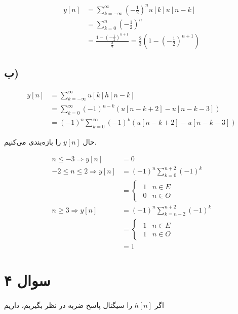 \documentclass{article}
\begin{document}
	\begin{align*}
		y[n] &= \sum_{k=-\infty}^{\infty} \left(-\frac{1}{2}\right)^n u[k] u[n-k] \\
		&= \sum_{k=0}^{n} \left(-\frac{1}{2}\right)^n \\
		&= \frac{1 - \left(-\frac{1}{2}\right)^{n+1}}{\frac{3}{2}}
		= \frac{2}{3}(1 - \left(-\frac{1}{2}\right)^{n+1})
	\end{align*}

	\subsection*{ب)}
	\begin{align*}
		y[n] &= \sum_{k=-\infty}^{\infty} u[k]h[n-k] \\
		&= \sum_{k=0}^{\infty} (-1)^{n-k} (u[n-k+2] - u[n-k-3]) \\
		&= (-1)^n \sum_{k=0}^{\infty} (-1)^{k} (u[n-k+2] - u[n-k-3])
	\end{align*}

	حال
	$y[n]$
	را بازه‌بندی می‌کنیم.

	\begin{align*}
		n \le -3 \Rightarrow y[n] &= 0 \\
		-2 \le n \le 2 \Rightarrow
		y[n] &= (-1)^n \sum_{k=0}^{n+2} (-1)^{k} \\
		&= \begin{cases}
			\begin{matrix}
				1 & n \in E \\
				0 & n \in O
			\end{matrix}
		\end{cases} \\
		n \ge 3 \Rightarrow
		y[n] &= (-1)^n \sum_{k=n-2}^{n+2} (-1)^{k} \\
		&= \begin{cases}
			\begin{matrix}
				1 & n \in E \\
				1 & n \in O
			\end{matrix}
		\end{cases} \\
		&= 1
	\end{align*}

	\section*{سوال ۴}
	\paragraph*{}
	اگر
	$h[n]$
	را سیگنال پاسخ ضربه در نظر بگیریم، داریم
\end{document}
